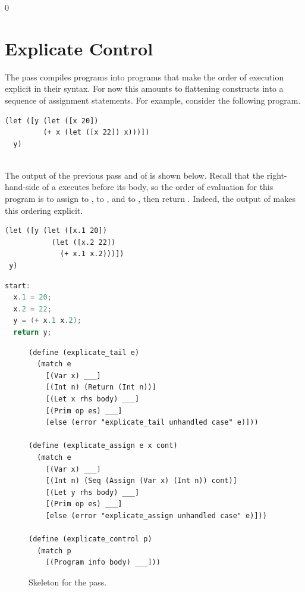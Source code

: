 \documentclass[7x10,nocrop]{TimesAPriori_MIT}%
\def\racketEd{0}
\def\edition{1}
\begin{document}
{\if\edition\racketEd  
\section{Explicate Control}
\label{sec:explicate-control-Lvar}

The  pass compiles \LangVar{} programs into \LangCVar{}
programs that make the order of execution explicit in their
syntax. For now this amounts to flattening  constructs into a
sequence of assignment statements. For example, consider the following
\LangVar{} program.\\
\begin{minipage}{0.96\textwidth}
\begin{lstlisting}
(let ([y (let ([x 20])
         (+ x (let ([x 22]) x)))])
  y)
\end{lstlisting}
\end{minipage}\\
%
The output of the previous pass and of  is
shown below. Recall that the right-hand-side of a  executes
before its body, so the order of evaluation for this program is to
assign  to ,  to , and
 to , then return . Indeed, the
output of  makes this ordering explicit.
\begin{transformation}
\begin{lstlisting}
(let ([y (let ([x.1 20]) 
           (let ([x.2 22])
             (+ x.1 x.2)))])
 y)
\end{lstlisting}
\compilesto
\begin{lstlisting}[language=C]
start:
  x.1 = 20;
  x.2 = 22;
  y = (+ x.1 x.2);
  return y;
\end{lstlisting}
\end{transformation}

\begin{figure}[tbp]
\begin{lstlisting}
(define (explicate_tail e)
  (match e
    [(Var x) ___]
    [(Int n) (Return (Int n))]
    [(Let x rhs body) ___]
    [(Prim op es) ___]
    [else (error "explicate_tail unhandled case" e)]))

(define (explicate_assign e x cont)
  (match e
    [(Var x) ___]
    [(Int n) (Seq (Assign (Var x) (Int n)) cont)]
    [(Let y rhs body) ___]
    [(Prim op es) ___]
    [else (error "explicate_assign unhandled case" e)]))

(define (explicate_control p)
  (match p
    [(Program info body) ___]))
\end{lstlisting}
\caption{Skeleton for the  pass.}
\label{fig:explicate-control-Lvar}
\end{figure}

}
\end{document}
